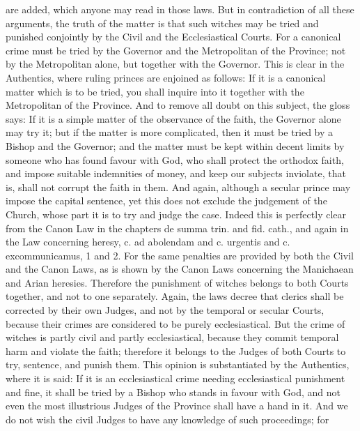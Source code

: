        are added, which anyone may read in those laws.
              But in contradiction of all these arguments, the truth of the matter is that such witches
       may be tried and punished conjointly by the Civil and the Ecclesiastical Courts. For a
       canonical crime must be tried by the Governor and the Metropolitan of the Province; not by
       the Metropolitan alone, but together with the Governor. This is clear in the Authentics,
       where ruling princes are enjoined as follows: If it is a canonical matter which is to be tried,
       you shall inquire into it together with the Metropolitan of the Province. And to remove all
       doubt on this subject, the gloss says: If it is a simple matter of the observance of the faith,
       the Governor alone may try it; but if the matter is more complicated, then it must be tried by
       a Bishop and the Governor; and the matter must be kept within decent limits by someone
       who has found favour with God, who shall protect the orthodox faith, and impose suitable
       indemnities of money, and keep our subjects inviolate, that is, shall not corrupt the faith in
       them.
              And again, although a secular prince may impose the capital sentence, yet this does not
       exclude the judgement of the Church, whose part it is to try and judge the case. Indeed this
       is perfectly clear from the Canon Law in the chapters de summa trin. and fid. cath., and
       again in the Law concerning heresy, c. ad abolendam and c. urgentis and c.
       excommunicamus, 1 and 2. For the same penalties are provided by both the Civil and the
       Canon Laws, as is shown by the Canon Laws concerning the Manichaean and Arian
       heresies. Therefore the punishment of witches belongs to both Courts together, and not to
       one separately.
              Again, the laws decree that clerics shall be corrected by their own Judges, and not by
       the temporal or secular Courts, because their crimes are considered to be purely
       ecclesiastical. But the crime of witches is partly civil and partly ecclesiastical, because they
       commit temporal harm and violate the faith; therefore it belongs to the Judges of both
       Courts to try, sentence, and punish them.
              This opinion is substantiated by the Authentics, where it is said: If it is an ecclesiastical
       crime needing ecclesiastical punishment and fine, it shall be tried by a Bishop who stands in
       favour with God, and not even the most illustrious Judges of the Province shall have a hand
       in it. And we do not wish the civil Judges to have any knowledge of such proceedings; for
